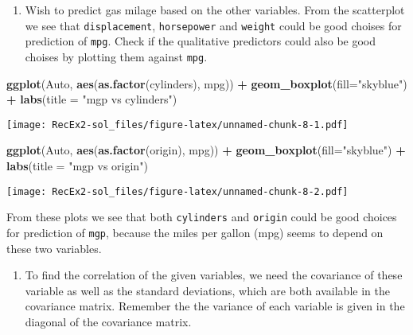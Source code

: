 \documentclass[]{article}
\newenvironment{Shaded}{\begin{snugshade}}{\end{snugshade}}
\newcommand{\DataTypeTok}[1]{\textcolor[rgb]{0.13,0.29,0.53}{#1}}
\newcommand{\KeywordTok}[1]{\textcolor[rgb]{0.13,0.29,0.53}{\textbf{#1}}}
\newcommand{\NormalTok}[1]{#1}
\newcommand{\OperatorTok}[1]{\textcolor[rgb]{0.81,0.36,0.00}{\textbf{#1}}}
\newcommand{\StringTok}[1]{\textcolor[rgb]{0.31,0.60,0.02}{#1}}
\providecommand{\tightlist}{%
  \setlength{\itemsep}{0pt}\setlength{\parskip}{0pt}}
\begin{document}
\begin{enumerate}
\def\labelenumi{\alph{enumi})}
\setcounter{enumi}{5}
\tightlist
\item
  Wish to predict gas milage based on the other variables. From the
  scatterplot we see that \texttt{displacement}, \texttt{horsepower} and
  \texttt{weight} could be good choises for prediction of \texttt{mpg}.
  Check if the qualitative predictors could also be good choises by
  plotting them against \texttt{mpg}.
\end{enumerate}

\begin{Shaded}
\begin{Highlighting}[]
\KeywordTok{ggplot}\NormalTok{(Auto, }\KeywordTok{aes}\NormalTok{(}\KeywordTok{as.factor}\NormalTok{(cylinders), mpg)) }\OperatorTok{+}\StringTok{ }\KeywordTok{geom_boxplot}\NormalTok{(}\DataTypeTok{fill=}\StringTok{"skyblue"}\NormalTok{) }\OperatorTok{+}\StringTok{ }\KeywordTok{labs}\NormalTok{(}\DataTypeTok{title =} \StringTok{"mgp vs cylinders"}\NormalTok{) }
\end{Highlighting}
\end{Shaded}

\texttt{[image: RecEx2-sol\_files/figure-latex/unnamed-chunk-8-1.pdf]}

\begin{Shaded}
\begin{Highlighting}[]
\KeywordTok{ggplot}\NormalTok{(Auto, }\KeywordTok{aes}\NormalTok{(}\KeywordTok{as.factor}\NormalTok{(origin), mpg)) }\OperatorTok{+}\StringTok{ }\KeywordTok{geom_boxplot}\NormalTok{(}\DataTypeTok{fill=}\StringTok{"skyblue"}\NormalTok{) }\OperatorTok{+}\StringTok{ }\KeywordTok{labs}\NormalTok{(}\DataTypeTok{title =} \StringTok{"mgp vs origin"}\NormalTok{) }
\end{Highlighting}
\end{Shaded}

\texttt{[image: RecEx2-sol\_files/figure-latex/unnamed-chunk-8-2.pdf]}

From these plots we see that both \texttt{cylinders} and \texttt{origin}
could be good choices for prediction of \texttt{mgp}, because the miles
per gallon (mpg) seems to depend on these two variables.

\begin{enumerate}
\def\labelenumi{\alph{enumi})}
\setcounter{enumi}{6}
\tightlist
\item
  To find the correlation of the given variables, we need the covariance
  of these variable as well as the standard deviations, which are both
  available in the covariance matrix. Remember the the variance of each
  variable is given in the diagonal of the covariance matrix.
\end{enumerate}
\end{document}
